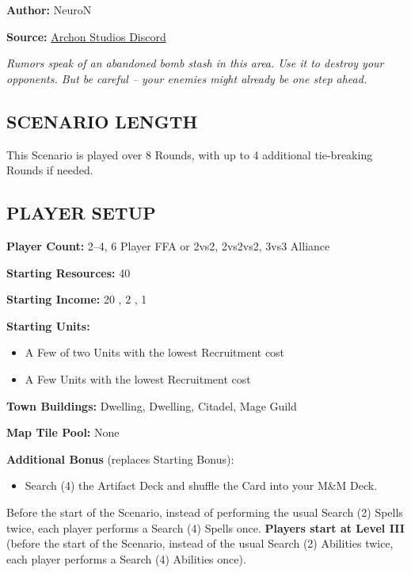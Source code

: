 
\begin{multicols}{2}

\textbf{Author:} NeuroN

\textbf{Source:} \href{https://discord.com/channels/740870068178649108/1278750250722525203/1278750250722525203}{Archon Studios Discord}

\textit{Rumors speak of an abandoned bomb stash in this area.
Use it to destroy your opponents.
But be careful -- your enemies might already be one step ahead.}

\subsection*{\MakeUppercase{Scenario Length}}
This Scenario is played over 8 Rounds, with up to 4 additional tie-breaking Rounds if needed.

\subsection*{\MakeUppercase{Player Setup}}
\textbf{Player Count:} 2--4, 6 Player FFA or 2vs2, 2vs2vs2, 3vs3 Alliance

\textbf{Starting Resources:} 40 

\textbf{Starting Income:} 20 , 2 , 1 

\textbf{Starting Units:}
\begin{itemize}
  \item A Few of two  Units with the lowest Recruitment cost
  \item A Few  Units with the lowest Recruitment cost
\end{itemize}

\textbf{Town Buildings:}  Dwelling,  Dwelling, Citadel, Mage Guild

\textbf{Map Tile Pool:} None

\textbf{Additional Bonus} (replaces Starting Bonus):

\begin{itemize}
  \item Search (4) the Artifact Deck and shuffle the Card into your M\&M Deck.
\end{itemize}
Before the start of the Scenario, instead of performing the usual Search (2) Spells twice, each player performs a Search (4) Spells once.
\textbf{Players start at Level III} (before the start of the Scenario, instead of the usual Search (2) Abilities twice, each player performs a Search (4) Abilities once).


\end{multicols}
